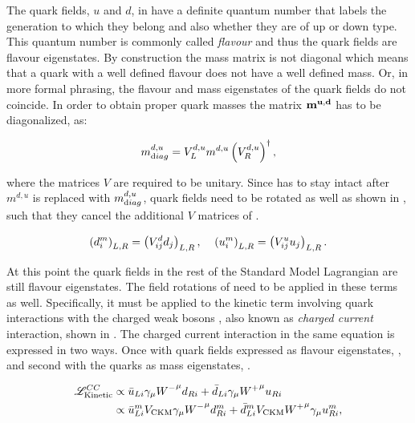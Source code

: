 The quark fields, $u$ and $d$,  in  have a definite quantum number that labels the generation to which they belong
and also whether they are of up or down type. This quantum number is commonly called {\it flavour} and thus the quark fields
are flavour eigenstates. By construction the mass matrix is not diagonal which means that
a quark with a well defined flavour does not have a well defined mass. Or, in more formal phrasing,
the flavour and mass eigenstates of the quark fields do not coincide. In order to obtain proper quark
masses the matrix $\bf m^{u,d}$ has to be diagonalized, as:

\begin{equation}
  \centering
  m^{d,u}_{\text diag} = V_L^{d,u} m^{d,u} \left(V_R^{d,u}\right)^{\dagger},
  \label{diagM}
\end{equation}

\noindent where the matrices $V$ are required to be unitary. Since  has to stay intact after $m^{d,u}$ is replaced with
$m^{d,u}_{\text diag}$, quark fields need to be rotated as well as shown in , such that they cancel the additional $V$ matrices
of .

\begin{equation}
  \centering
  \left( d_{i}^m \right)_{L,R} = \left( V^d_{ij} d_{j} \right)_{L,R}, \;\;\;\; \left( u_{i}^m \right)_{L,R} = \left( V^u_{ij} u_{j} \right)_{L,R}.
  \label{quark_rotation}
\end{equation}

\noindent At this point the quark fields in the rest of the Standard Model Lagrangian are still flavour eigenstates.
The field rotations of  need to be applied in these terms as well. Specifically, it must be
applied to the kinetic term involving quark interactions with the charged weak bosons \Wpm, also known as {\it charged current}
interaction, shown in . The charged current interaction in the same equation is expressed in two ways.
Once with quark fields expressed as flavour eigenstates, , and second with the quarks as mass eigenstates, .

\begin{subequations}
  \centering
  \begin{align}
    \mathscr{L}_{\text{Kinetic}}^{CC} & \propto \bar{u}_{Li} \gamma_\mu {\Wm}^\mu d_{Ri} + \bar{d}_{Li} \gamma_\mu {\Wp}^\mu u_{Ri}  \label{CClagrangianInt} \\
                                      & \propto \bar{u}_{Li}^m  {V_{\text{CKM}}} \gamma_\mu {\Wm}^\mu d_{Ri}^m + \bar{d}_{Li}^m V_{\text{CKM}} {\Wp}^\mu \gamma_\mu u_{Ri}^m, \label{CClagrangianMass}
  \end{align}
  \label{CClagrangian}
\end{subequations}

